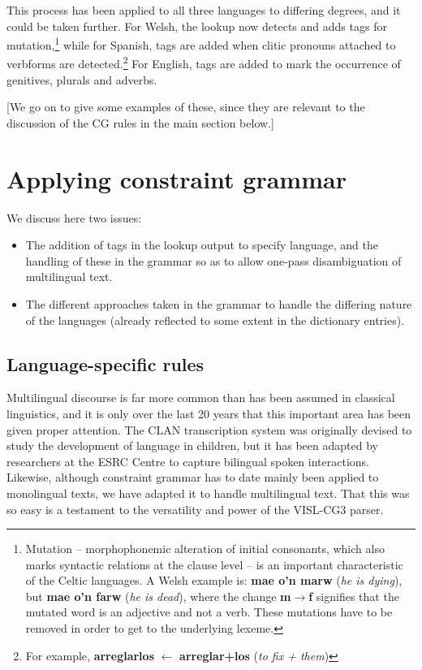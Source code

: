 \documentclass[11pt]{article}
\begin{document}
This process has been applied to all three languages to differing degrees, and it could be taken further.  For Welsh, the lookup now detects and adds tags for mutation,\footnote{Mutation -- morphophonemic alteration of initial consonants, which also marks syntactic relations at the clause level -- is an important characteristic of the Celtic languages. A Welsh example is: \textbf{mae o'n marw} (\textit{he is dying}), but \textbf{mae o'n farw} (\textit{he is dead}), where the change \textbf{m$\rightarrow$f} signifies that the mutated word is an adjective and not a verb. These mutations have to be removed in order to get to the underlying lexeme.} while for Spanish, tags are added when clitic pronouns attached to verbforms are detected.\footnote{For example, \textbf{arreglarlos} $\leftarrow$ \textbf{arreglar+los} (\textit{to fix + them})}  For English, tags are added to mark the occurrence of genitives, plurals and adverbs.

[We go on to give some examples of these, since they are relevant to the discussion of the CG rules in the main section below.]

\section{Applying constraint grammar}
\label{sec:constraint}

We discuss here two issues:
\begin{itemize}
\item The addition of tags in the lookup output to specify language, and the handling of these in the grammar so as to allow one-pass disambiguation of multilingual text.
\item The different approaches taken in the grammar to handle the differing nature of the languages (already reflected to some extent in the dictionary entries).
\end{itemize}

\subsection{Language-specific rules}
\label{sec:langspec}

Multilingual discourse is far more common than has been assumed in classical linguistics, and it is only over the last 20 years that this important area has been given proper attention.  The CLAN transcription system was originally devised to study the development of language in children, but it has been adapted by researchers at the ESRC Centre to capture bilingual spoken interactions.  Likewise, although constraint grammar has to date mainly been applied to monolingual texts, we have adapted it to handle multilingual text.  That this was so easy is a testament to the versatility and power of the VISL-CG3 parser.
\end{document}
